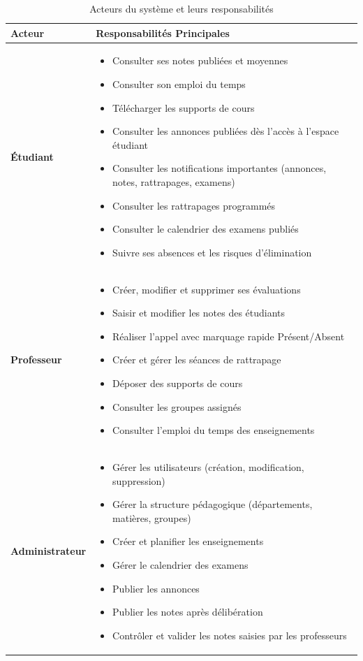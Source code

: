 \documentclass[12pt,a4paper]{report}
\begin{document}
\begin{table}[H]
\centering
\caption{Acteurs du système et leurs responsabilités}
\begin{tabular}{|p{3cm}|p{11cm}|}
\hline
\textbf{Acteur} & \textbf{Responsabilités Principales} \\
\hline
\textbf{Étudiant} & 
\begin{itemize}[leftmargin=*, nosep]
    \item Consulter ses notes publiées et moyennes
    \item Consulter son emploi du temps
    \item Télécharger les supports de cours
    \item Consulter les annonces publiées dès l'accès à l'espace étudiant
    \item Consulter les notifications importantes (annonces, notes, rattrapages, examens)
    \item Consulter les rattrapages programmés
    \item Consulter le calendrier des examens publiés
    \item Suivre ses absences et les risques d'élimination
\end{itemize} \\
\hline
\textbf{Professeur} & 
\begin{itemize}[leftmargin=*, nosep]
    \item Créer, modifier et supprimer ses évaluations
    \item Saisir et modifier les notes des étudiants
    \item Réaliser l'appel avec marquage rapide Présent/Absent
    \item Créer et gérer les séances de rattrapage
    \item Déposer des supports de cours
    \item Consulter les groupes assignés
    \item Consulter l'emploi du temps des enseignements
\end{itemize} \\
\hline
\textbf{Administrateur} & 
\begin{itemize}[leftmargin=*, nosep]
    \item Gérer les utilisateurs (création, modification, suppression)
    \item Gérer la structure pédagogique (départements, matières, groupes)
    \item Créer et planifier les enseignements
    \item Gérer le calendrier des examens
    \item Publier les annonces
    \item Publier les notes après délibération
    \item Contrôler et valider les notes saisies par les professeurs
\end{itemize} \\
\hline
\end{tabular}
\end{table}
\end{document}
